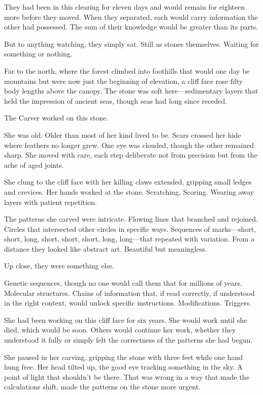 They had been in this clearing for eleven days and would remain for eighteen more before they moved. When they separated, each would carry information the other had possessed. The sum of their knowledge would be greater than its parts.

But to anything watching, they simply sat. Still as stones themselves. Waiting for something or nothing.

\scenebreak

Far to the north, where the forest climbed into foothills that would one day be mountains but were now just the beginning of elevation, a cliff face rose fifty body lengths above the canopy. The stone was soft here—sedimentary layers that held the impression of ancient seas, though seas had long since receded.

The Carver worked on this stone.

She was old. Older than most of her kind lived to be. Scars crossed her hide where feathers no longer grew. One eye was clouded, though the other remained sharp. She moved with care, each step deliberate not from precision but from the ache of aged joints.

She clung to the cliff face with her killing claws extended, gripping small ledges and crevices. Her hands worked at the stone. Scratching. Scoring. Wearing away layers with patient repetition.

The patterns she carved were intricate. Flowing lines that branched and rejoined. Circles that intersected other circles in specific ways. Sequences of marks—short, short, long, short, short, short, long, long—that repeated with variation. From a distance they looked like abstract art. Beautiful but meaningless.

Up close, they were something else.

Genetic sequences, though no one would call them that for millions of years. Molecular structures. Chains of information that, if read correctly, if understood in the right context, would unlock specific instructions. Modifications. Triggers.

She had been working on this cliff face for six years. She would work until she died, which would be soon. Others would continue her work, whether they understood it fully or simply felt the correctness of the patterns she had begun.

She paused in her carving, gripping the stone with three feet while one hand hung free. Her head tilted up, the good eye tracking something in the sky. A point of light that shouldn't be there. That was wrong in a way that made the calculations shift, made the patterns on the stone more urgent.

